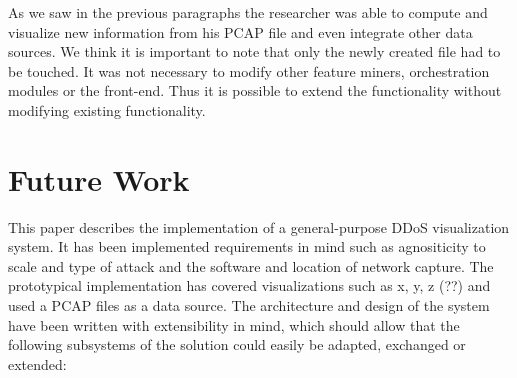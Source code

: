 As we saw in the previous paragraphs the researcher was able to compute and visualize new information from his PCAP file and even integrate other data sources.
We think it is important to note that only the newly created file had to be touched. It was not necessary to modify other feature miners, orchestration modules or the front-end. Thus it is possible to extend the functionality without modifying existing functionality.

\section{Future Work} %
This paper describes the implementation of a general-purpose DDoS visualization system. It has been implemented requirements in mind such as agnositicity to scale and type of attack and the software and location of network capture.
The prototypical implementation has covered visualizations such as x, y, z (??) and used a PCAP files as a data source.
The architecture and design of the system have been written with extensibility in mind, which should allow that the following subsystems of the solution could easily be adapted, exchanged or extended:

